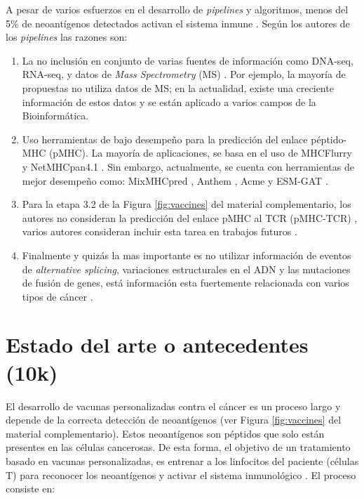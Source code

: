 \documentclass[a4paper,11pt]{article}
\begin{document}
A pesar de varios esfuerzos en el desarrollo de \textit{pipelines} y algoritmos, menos del 5\% de neoantígenos detectados activan el sistema inmune \cite{de2020neoantigen, mill2022neoms, bulik2019deep, bassani2015mass, yadav2014predicting}. Según los autores de los \textit{pipelines} las razones son: 

\begin{enumerate}
	\item La no inclusión en conjunto de varias fuentes de información como DNA-seq, RNA-seq, y datos de \textit{Mass Spectrometry} (MS) \cite{kim2018neopepsee}. Por ejemplo, la mayoría de  propuestas no utiliza datos de MS; en la actualidad, existe una creciente información de estos datos y se están aplicado a varios campos de la Bioinformática.
	
	\item  Uso herramientas de bajo desempeño para la predicción del enlace péptido-MHC (pMHC). La mayoría de aplicaciones, se basa en el uso de MHCFlurry \cite{o2020mhcflurry} y NetMHCpan4.1 \cite{reynisson2020netmhcpan}. Sin embargo, actualmente, se cuenta con herramientas de mejor desempeño como: MixMHCpred \cite{gfeller2023improved},  Anthem \cite{mei2021anthem}, Acme \cite{hu2019acme} y ESM-GAT \cite{hashemi2023improved}.
	
	\item Para la etapa 3.2 de la Figura \ref{fig:vaccines} del material complementario, los autores no consideran  la predicción del enlace pMHC al TCR (pMHC-TCR) , varios autores consideran incluir esta tarea en trabajos futuros  \cite{rubinsteyn2018computational}.
	
	\item Finalmente y quizás la mas importante es no utilizar información de eventos de \textit{alternative splicing}, variaciones estructurales en el ADN y las mutaciones de fusión de genes, está información esta fuertemente relacionada con varios tipos de cáncer \cite{wood2020neoepiscope}.
\end{enumerate}

\section{Estado del arte o antecedentes (10k)}
	

	
El desarrollo de vacunas personalizadas contra el cáncer es un proceso largo y depende de la correcta detección de neoantígenos (ver Figura \ref{fig:vaccines} del material complementario). Estos neoantígenos son péptidos que solo están presentes en las células cancerosas. De esta forma, el objetivo de un tratamiento basado en vacunas personalizadas, es entrenar a los linfocitos del paciente (células T) para reconocer los neoantígenos y activar el sistema inmunológico \cite{de2020neoantigen, peng2019neoantigen}. El proceso consiste en: 
	
\end{document}
